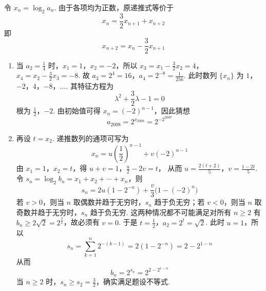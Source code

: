 \begin{solution}
令 \(x_n=\log_{2}a_n\). 由于各项均为正数，原递推式等价于
\[
x_n=\frac{3}{2}x_{n+1}+x_{n+2}
\]
即
\[
x_{n+2}=x_n-\frac{3}{2}x_{n+1}
\]

\begin{enumerate}
\item 当 \(a_2=\frac14\) 时，\(x_1=1\)，\(x_2=-2\)，所以
\(x_3=x_1-\frac{3}{2}x_2=4\)，\(x_4=x_2-\frac{3}{2}x_3=-8\).
故 \(a_3=2^{4}=16\)，\(a_4=2^{-8}=\frac{1}{256}\). 此时数列 \(\{x_n\}\) 为 \(1\)，\(-2\)，\(4\)，\(-8\)，\(\ldots\). 其特征方程为
\[
\lambda^{2}+\frac{3}{2}\lambda-1=0
\]
根为 \(\frac12\)，\(-2\). 由初始值可得 \(x_n=(-2)^{n-1}\)，因此猜想
\[
a_{2008}=2^{x_{2008}}=2^{-2^{2007}}
\]

\item 再设 \(t=x_2\). 递推数列的通项可写为
\[
x_n=u\left(\frac12\right)^{n-1}+v(-2)^{n-1}
\]
由 \(x_1=1\)，\(x_2=t\)，得
\(u+v=1\)，\(\frac{u}{2}-2v=t\)，
从而
\(u=\frac{2(t+2)}{5}\)，\(v=\frac{1-2t}{5}\).
令 \(s_n=\log_{2}b_n=x_1+x_2+\cdots+x_n\)，则
\[
s_n=2u(1-2^{-n})+\frac{v}{3}\bigl(1-(-2)^n\bigr)
\]
若 \(v>0\)，则当 \(n\) 取偶数并趋于无穷时，\(s_n\) 趋于负无穷；若 \(v<0\)，则当 \(n\) 取奇数并趋于无穷时，\(s_n\) 趋于负无穷. 这两种情况都不可能满足对所有 \(n\geqslant2\) 有 \(b_n\geqslant2\sqrt{2}=2^{\frac{3}{2}}\)，故必须有 \(v=0\). 于是
\(t=\frac12\)，\(a_2=2^t=\sqrt{2}\).
此时 \(u=1\)，所以
\[
s_n=\sum_{k=1}^{n}2^{-(k-1)}=2(1-2^{-n})=2-2^{1-n}
\]
从而
\[
b_n=2^{s_n}=2^{2-2^{1-n}}
\]
当 \(n\geqslant2\) 时，\(s_n\geqslant s_2=\frac32\)，确实满足题设不等式.
\end{enumerate}
\end{solution}
